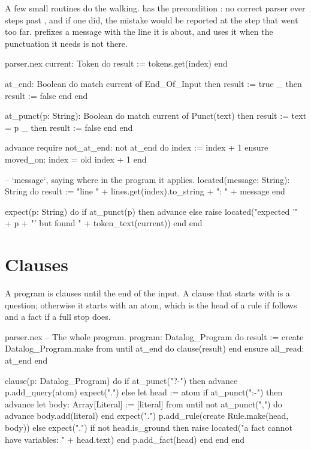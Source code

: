 A few small routines do the walking.  has the precondition
: no correct parser ever steps past ,
and if one did, the mistake would be reported at the step that went too
far.  prefixes a message with the line it is about, and
 uses it when the punctuation it needs is not there.

\begin{continued}{parser.nex}
  current: Token
  do
    result := tokens.get(index)
  end

  at_end: Boolean
  do
    match current of
      End_Of_Input then result := true
      _            then result := false
    end
  end

  at_punct(p: String): Boolean
  do
    match current of
      Punct(text) then result := text = p
      _           then result := false
    end
  end

  advance
  require
    not_at_end: not at_end
  do
    index := index + 1
  ensure
    moved_on: index = old index + 1
  end

  -- `message`, saying where in the program it applies.
  located(message: String): String
  do
    result := "line " + lines.get(index).to_string + ": " + message
  end

  expect(p: String)
  do
    if at_punct(p) then
      advance
    else
      raise located("expected '" + p + "' but found " + token_text(current))
    end
  end
\end{continued}

\section{Clauses}

A program is clauses until the end of the input. A clause that starts with
 is a question; otherwise it starts with an atom, which is the
head of a rule if \code{:-} follows and a fact if a full stop does.

\begin{continued}{parser.nex}
  -- The whole program.
  program: Datalog_Program
  do
    result := create Datalog_Program.make
    from until at_end do
      clause(result)
    end
  ensure
    all_read: at_end
  end

  clause(p: Datalog_Program)
  do
    if at_punct("?-") then
      advance
      p.add_query(atom)
      expect(".")
    else
      let head := atom
      if at_punct(":-") then
        advance
        let body: Array[Literal] := [literal]
        from until not at_punct(",") do
          advance
          body.add(literal)
        end
        expect(".")
        p.add_rule(create Rule.make(head, body))
      else
        expect(".")
        if not head.is_ground then
          raise located("a fact cannot have variables: " + head.text)
        end
        p.add_fact(head)
      end
    end
  end
\end{continued}

